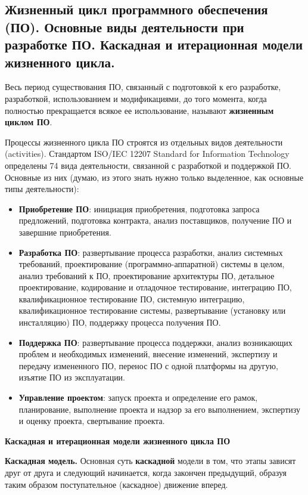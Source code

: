 \subsection{Жизненный  цикл  программного  обеспечения  (ПО).  Основные  виды  деятельности  при  разработке  ПО. Каскадная и итерационная модели жизненного цикла.}

Весь период существования ПО, связанный с подготовкой к его разработке, разработкой, использованием и модификациями, до того момента, когда полностью прекращается всякое ее использование, называют \textbf{жизненным циклом ПО}.

Процессы жизненного цикла ПО строятся из отдельных видов деятельности (activities).
Стандартом ISO/IEC 12207 Standard for Information Technology определены 74 вида деятельности, связанной с разработкой и поддержкой ПО.
Основные из них (думаю, из этого знать нужно только выделенное, как основные типы деятельности):
\begin{itemize}
    \item \textbf{Приобретение ПО}: инициация приобретения, подготовка запроса предложений, подготовка контракта, анализ поставщиков, получение ПО и завершние приобретения.
    \item \textbf{Разработка ПО}: развертывание процесса разработки, анализ системных требований, проектирование (программно-аппаратной) системы в целом, анализ требований к ПО, проектирование архитектуры ПО, детальное проектирование, кодирование и отладочное тестирование, интеграцию ПО, квалификационное тестирование ПО, системную интеграцию, квалификационное тестирование системы, развертывание (установку или инсталляцию) ПО, поддержку процесса получения ПО.
    \item \textbf{Поддержка ПО}: развертывание процесса поддержки, анализ возникающих проблем и необходимых изменений, внесение изменений, экспертизу и передачу измененного ПО, перенос ПО с одной платформы на другую, изъятие ПО из эксплуатации.
    \item \textbf{Управление проектом}: запуск проекта и определение его рамок, планирование, выполнение проекта и надзор за его выполнением, экспертизу и оценку проекта, свертывание проекта.
\end{itemize}

\textbf{Каскадная и итерационная модели жизненного цикла ПО}

\textbf{Каскадная модель.} Основная суть \textbf{каскадной} модели в том, что этапы зависят друг от друга и следующий начинается, когда закончен предыдущий, образуя таким образом поступательное (каскадное) движение вперед. 

